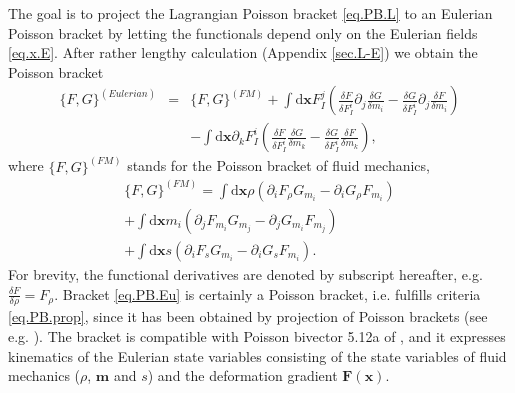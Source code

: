 \documentclass[
10pt, %
a4paper, %
oneside, %
headinclude,footinclude, %
BCOR5mm, %
]{scrartcl}
\newcommand{\xx}{\mathbf{x}}
\newcommand{\dx}{\mathrm{d}\xx}
\newcommand{\mm}{\mathbf{m}}
\newcommand{\FF}{\mathbf{F}}
\begin{document}
The goal is to project the Lagrangian Poisson bracket \eqref{eq.PB.L} to an Eulerian Poisson bracket by letting the functionals depend only on the Eulerian fields \eqref{eq.x.E}. After rather lengthy calculation (Appendix \ref{sec.L-E}) we obtain the Poisson bracket
\begin{eqnarray}\label{eq.PB.Eu}
	\{F,G\}^{(Eulerian)} &=& \{F,G\}^{(FM)} + \int\dx F^j_I \left(\frac{\delta F}{\delta F^i_I} \partial_j \frac{\delta G}{\delta m_i}-\frac{\delta G}{\delta F^i_I} \partial_j \frac{\delta F}{\delta m_i}\right)\nonumber\\
	&&-\int\dx \partial_k F^i_I \left(\frac{\delta F}{\delta F^i_I} \frac{\delta G}{\delta m_k}-\frac{\delta G}{\delta F^i_I} \frac{\delta F}{\delta m_k}\right),
\end{eqnarray}
where $\{F,G\}^{(FM)}$ stands for the Poisson bracket of fluid mechanics,
\begin{multline}
	\{F,G\}^{(FM)} = \int\dx \rho (\partial_i F_\rho G_{m_i}-\partial_i G_\rho F_{m_i})\\
	+ \int\dx m_i (\partial_j F_{m_i} G_{m_j}-\partial_j G_{m_i} F_{m_j})\\
	+ \int\dx s (\partial_i F_s G_{m_i}-\partial_i G_s F_{m_i}).
\end{multline}
For brevity, the functional derivatives are denoted by subscript hereafter, e.g. $\frac{\delta F}{\delta \rho} = F_\rho$.
Bracket \eqref{eq.PB.Eu} is certainly a Poisson bracket, i.e. fulfills criteria \eqref{eq.PB.prop}, since it has been obtained by projection of Poisson brackets (see e.g. \cite{PhysD-hierarchy}). The bracket is compatible with Poisson bivector 5.12a of \cite{Markus2009}, and it expresses kinematics of the Eulerian state variables consisting of the state variables of fluid mechanics ($\rho$, $\mm$ and $s$) and the deformation gradient $\FF(\xx)$.
\end{document}
